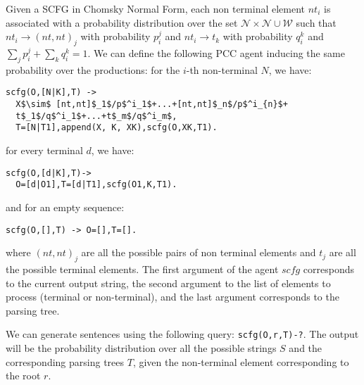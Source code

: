 \documentclass[letterpaper]{article}
\theoremstyle{plain}
\theoremstyle{definition}
\theoremstyle{remark}
\theoremstyle{definition}
\begin{document}
Given a SCFG in Chomsky Normal Form, each non terminal element $nt_i$ is associated with a probability distribution over the set  $\mathcal{N} \times \mathcal{N} \cup \mathcal{W}$ such that
$nt_i \rightarrow (nt,nt)_j$ with probability $p_i^j$ and $nt_i \rightarrow t_k$ with probability $q_i^k$ and $\sum_j p_i^j + \sum_k q_i^k=1$. We can define the following PCC agent inducing the same probability over the productions:
for the $i$-th non-terminal $N$, we have:
\begin{lstlisting}[mathescape=true]
scfg(O,[N|K],T) ->
  X$\sim$ [nt,nt]$_1$/p$^i_1$+...+[nt,nt]$_n$/p$^i_{n}$+
  t$_1$/q$^i_1$+...+t$_m$/q$^i_m$,
  T=[N|T1],append(X, K, XK),scfg(O,XK,T1).
\end{lstlisting}
for every terminal $d$, we have:
\begin{lstlisting}[mathescape=true]
scfg(O,[d|K],T)->
  O=[d|O1],T=[d|T1],scfg(O1,K,T1).
\end{lstlisting}
and for an empty sequence:
\begin{lstlisting}[mathescape=true]
scfg(O,[],T) -> O=[],T=[].
\end{lstlisting}
where $(nt,nt)_j$ are all the possible pairs of non terminal elements and $t_j$ are all the possible terminal elements.
The first argument of the agent $scfg$ corresponds to the current output string, the second argument to the list of elements to process (terminal or non-terminal), and the last argument corresponds to the parsing tree.


We can generate sentences using the following query: \lstinline{scfg(O,r,T)-?}. The output will be the probability distribution over all the possible strings $S$ and the corresponding parsing trees $T$, given the non-terminal element corresponding to the root $r$.






\end{document}
